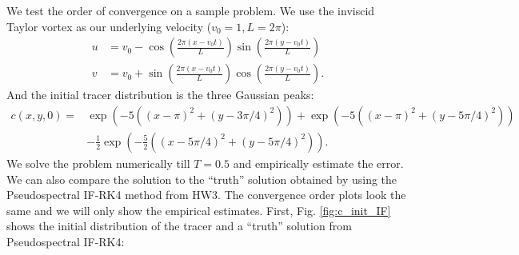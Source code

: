 \documentclass[11pt,letterpaper]{article}
\begin{document}
We test the order of convergence on a sample problem. We use the inviscid Taylor vortex as our underlying velocity ($v_0 = 1, L = 2\pi$):
\begin{align*}
    u &= v_0-\cos\left(\frac{2\pi(x-v_0t)}{L}\right)\sin\left(\frac{2\pi(y-v_0t)}{L}\right)\\
    v &= v_0+\sin\left(\frac{2\pi(x-v_0t)}{L}\right)\cos\left(\frac{2\pi(y-v_0t)}{L}\right).
\end{align*}
And the initial tracer distribution is the three Gaussian peaks:
\begin{align*}
    c(x,y,0) =& \exp\left( -5\left((x-\pi)^2+(y-3\pi/4)^2\right) \right)+\exp\left( -5\left((x-\pi)^2+(y-5\pi/4)^2\right) \right)\\
    &-\frac{1}{2}\exp\left( -\frac{5}{2}\left((x-5\pi/4)^2+(y-5\pi/4)^2\right) \right).
\end{align*}
We solve the problem numerically till $T = 0.5$ and empirically estimate the error. We can also compare the solution to the ``truth'' solution obtained by using the Pseudospectral IF-RK4 method from HW3. The convergence order plots look the same and we will only show the empirical estimates. First, Fig. \ref{fig:c_init_IF} shows the initial distribution of the tracer and a ``truth'' solution from Pseudospectral IF-RK4:
\end{document}
